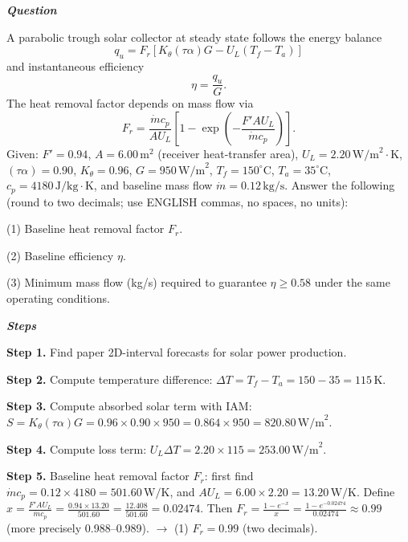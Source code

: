 \begin{tcolorbox}[
    breakable,
    title=Example of Scientific Deep Research in Energy,
    colback=LighterGray,
    colframe=DeepPurple,
    colbacktitle=DeepPurple,
    coltitle=White,
]
\textbf{\emph{\textcolor{DeepPurple}{Question}}}

A parabolic trough solar collector at steady state follows the energy balance
\[
q_u = F_r\left[ K_\theta (\tau \alpha) G - U_L (T_f - T_a) \right]
\]
and instantaneous efficiency
\[
\eta = \frac{q_u}{G}.
\]
The heat removal factor depends on mass flow via
\[
F_r = \frac{\dot{m} c_p}{A U_L} \left[1 - \exp\left(-\frac{F' A U_L}{\dot{m} c_p}\right)\right].
\]
Given: \( F' = 0.94 \), \( A = 6.00\,\mathrm{m}^2 \) (receiver heat-transfer area), \( U_L = 2.20\,\mathrm{W/m}^2\cdot\mathrm{K} \), \( (\tau\alpha) = 0.90 \), \( K_\theta = 0.96 \), \( G = 950\,\mathrm{W/m}^2 \), \( T_f = 150^\circ\mathrm{C} \), \( T_a = 35^\circ\mathrm{C} \), \( c_p = 4180\,\mathrm{J}/\mathrm{kg}\cdot\mathrm{K} \), and baseline mass flow \( \dot{m} = 0.12\,\mathrm{kg}/\mathrm{s} \). Answer the following (round to two decimals; use ENGLISH commas, no spaces, no units):

(1) Baseline heat removal factor \( F_r \).

(2) Baseline efficiency \( \eta \).

(3) Minimum mass flow (kg/s) required to guarantee \( \eta \geq 0.58 \) under the same operating conditions.

\textbf{\emph{\textcolor{DeepPurple}{Steps}}}

\textbf{\textcolor{CaseOrange}{Step 1.}} Find paper 2D-interval forecasts for solar power production.

\textbf{\textcolor{CaseOrange}{Step 2.}} Compute temperature difference: \( \Delta T = T_f - T_a = 150 - 35 = 115\,\mathrm{K} \).

\textbf{\textcolor{CaseOrange}{Step 3.}} Compute absorbed solar term with IAM: \( S = K_\theta (\tau\alpha) G = 0.96 \times 0.90 \times 950 = 0.864 \times 950 = 820.80\,\mathrm{W/m}^2 \).

\textbf{\textcolor{CaseOrange}{Step 4.}} Compute loss term: \( U_L \Delta T = 2.20 \times 115 = 253.00\,\mathrm{W/m}^2 \).

\textbf{\textcolor{CaseOrange}{Step 5.}} Baseline heat removal factor \( F_r \): first find \( \dot{m} c_p = 0.12 \times 4180 = 501.60\,\mathrm{W/K} \), and \( A U_L = 6.00 \times 2.20 = 13.20\,\mathrm{W/K} \). Define \( x = \frac{F' A U_L}{\dot{m} c_p} = \frac{0.94 \times 13.20}{501.60} = \frac{12.408}{501.60} = 0.02474 \). Then \( F_r = \frac{1 - e^{-x}}{x} = \frac{1 - e^{-0.02474}}{0.02474} \approx 0.99 \) (more precisely 0.988--0.989). \( \rightarrow \) (1) \( F_r = 0.99 \) (two decimals).


\end{tcolorbox}
